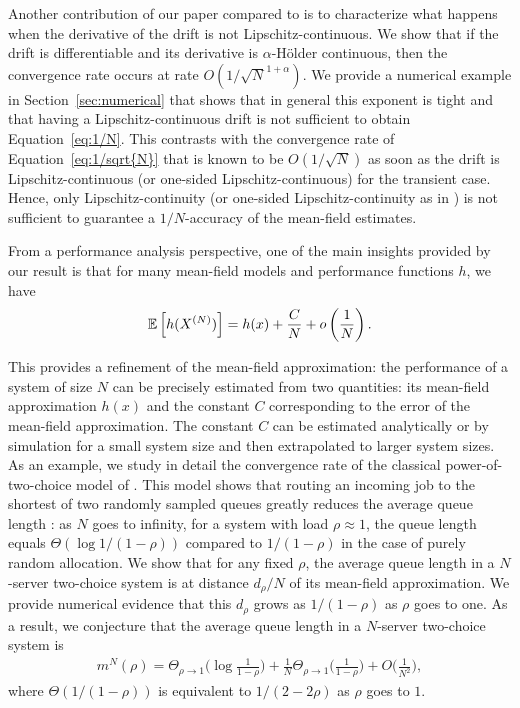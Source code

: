 \documentclass[sigconf]{acmart}
\newcommand\XN{X^{(N)}}
\newcommand\esp[1]{{\mathchoice{\besp{#1}}{\sesp{#1}}{\sesp{#1}}{\sesp{#1}}}}
\newcommand\besp[1]{\mathbb{E}\left[#1\right]}
\newcommand\sesp[1]{\mathbb{E}[#1]}
\newcommand\p[1]{\left(#1\right)}
\begin{document}
Another contribution of our paper compared to
\cite{kolokoltsov2011mean,ying2016rate} is to characterize what
happens when the derivative of the drift is not
Lipschitz-continuous.  We show that if the drift is differentiable and
its derivative is $\alpha$-Hölder continuous, then the convergence
rate occurs at rate $O(1/\sqrt{N}^{1+\alpha})$.  We provide a
numerical example in Section~\ref{sec:numerical} that shows that in
general this exponent is tight and that having a Lipschitz-continuous
drift is not sufficient to obtain Equation~\eqref{eq:1/N}. This
contrasts with the convergence rate of Equation~\eqref{eq:1/sqrt{N}}
that is known to be $O(1/\sqrt{N})$ as soon as the drift is
Lipschitz-continuous (or one-sided Lipschitz-continuous) for the
transient case.  Hence, only Lipschitz-continuity (or one-sided
Lipschitz-continuity as in \cite{gast2012markov,tsitsiklis2011power})
is not sufficient to guarantee a $1/N$-accuracy of the mean-field
estimates.

From a performance analysis perspective, one of the main insights
provided by our result is that for many mean-field models and
performance functions $h$, we have
\begin{align}
  \label{eq:C/N}
  \esp{h(\XN)} = h(x)+\frac{C}{N} + o\p{\frac1N}.
\end{align}

This provides a refinement of the mean-field approximation: the
performance of a system of size $N$ can be precisely estimated from
two quantities: its mean-field approximation $h(x)$ and the constant
$C$ corresponding to the error of the mean-field approximation. The
constant $C$ can be estimated analytically or by simulation for a
small system size and then extrapolated to larger system sizes.  As an
example, we study in detail the convergence rate of the classical
power-of-two-choice model of
\cite{mitzenmacher1996power,vvedenskaya1996queueing}. This model shows
that routing an incoming job to the shortest of two randomly sampled
queues greatly reduces the average queue length : as $N$ goes to
infinity, for a system with load $\rho\approx1$, the queue length
equals $\Theta(\log 1/(1-\rho))$ compared to $1/(1-\rho)$ in the case
of purely random allocation. We show that for any fixed $\rho$, the
average queue length in a $N$-server two-choice system is at distance
$d_\rho/N$ of its mean-field approximation. We provide numerical
evidence that this $d_\rho$ grows as $1/(1-\rho)$ as $\rho$ goes to
one. As a result, we conjecture that the average queue length in a
$N$-server two-choice system is 
\begin{align*}
  m^N(\rho) = \Theta_{\rho\to1}\Big(\log\frac1{1-\rho}\Big)
  + \frac{1}{N}\Theta_{\rho\to1}\Big(\frac{1}{1-\rho}\Big) +
  O\Big(\frac1{N^2}\Big),
\end{align*}
where $\Theta(1/(1-\rho))$ is equivalent to $1/(2-2\rho)$ as $\rho$
goes to $1$.
\end{document}
